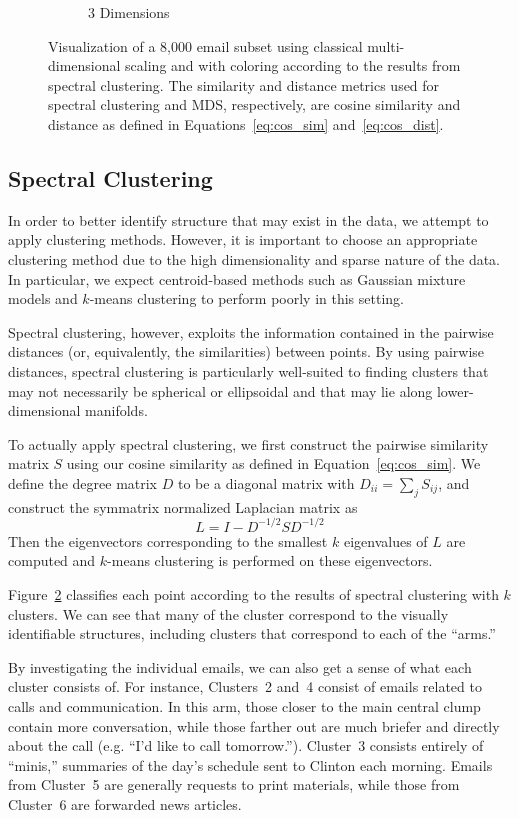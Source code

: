 \documentclass[12pt]{article}
\theoremstyle{definition}
\theoremstyle{algodesc}
\begin{document}
\begin{figure}[htbp]
\begin{subfigure}[t]{.7\linewidth}
    \caption{3 Dimensions} \label{fig:cluster:3d}
  \end{subfigure}
  \caption{Visualization of a 8,000 email subset using classical multi-dimensional scaling and with coloring according to the results from spectral clustering. The similarity and distance metrics used for spectral clustering and MDS, respectively, are cosine similarity and distance as defined in Equations~\ref{eq:cos_sim} and~\ref{eq:cos_dist}.}
  \label{fig:cluster}
\end{figure}


\subsection{Spectral Clustering} \label{sec:spec_cluster}
In order to better identify structure that may exist in the data, we attempt to apply clustering methods. However, it is important to choose an appropriate clustering method due to the high dimensionality and sparse nature of the data. In particular, we expect centroid-based methods such as Gaussian mixture models and $k$-means clustering to perform poorly in this setting.

Spectral clustering, however, exploits the information contained in the pairwise distances (or, equivalently, the similarities) between points. By using pairwise distances, spectral clustering is particularly well-suited to finding clusters that may not necessarily be spherical or ellipsoidal and that may lie along lower-dimensional manifolds.

To actually apply spectral clustering, we first construct the pairwise similarity matrix $S$ using our cosine similarity as defined in Equation~\ref{eq:cos_sim}. We define the degree matrix $D$ to be a diagonal matrix with $D_{ii} = \sum_j S_{ij}$, and construct the symmatrix normalized Laplacian matrix as
\begin{equation} \label{eq:laplacian}
L = I - D^{-1/2} S D^{-1/2}
\end{equation}
Then the eigenvectors corresponding to the smallest $k$ eigenvalues of $L$ are computed and $k$-means clustering is performed on these eigenvectors.

Figure~\ref{fig:cluster} classifies each point according to the results of spectral clustering with $k$ clusters. We can see that many of the cluster correspond to  the visually identifiable structures, including clusters that correspond to each of the ``arms.''

By investigating the individual emails, we can also get a sense of what each cluster consists of. For instance, Clusters~2 and~4 consist of emails related to calls and communication. In this arm, those closer to the main central clump contain more conversation, while those farther out are much briefer and directly about the call (e.g. ``I'd like to call tomorrow.''). Cluster~3 consists entirely of ``minis,'' summaries of the day's schedule sent to Clinton each morning. Emails from Cluster~5 are generally requests to print materials, while those from Cluster~6 are forwarded news articles.
\end{document}
